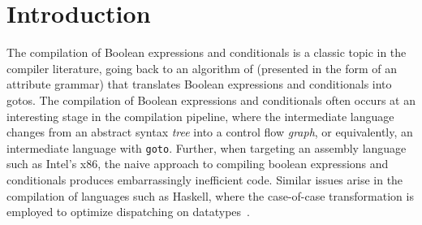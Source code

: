 \documentclass[sigplan,screen]{acmart}
\begin{document}



\maketitle

\section{Introduction}

The compilation of Boolean expressions and conditionals is a classic
topic in the compiler literature, going back to an algorithm of
\citet{Aho:1986qf} (presented in the form of an attribute grammar)
that translates Boolean expressions and conditionals into gotos. The
compilation of Boolean expressions and conditionals often occurs at an
interesting stage in the compilation pipeline, where the intermediate
language changes from an abstract syntax \emph{tree} into a control
flow \emph{graph}, or equivalently, an intermediate language with
\texttt{goto}. Further, when targeting an assembly language such as
Intel's x86, the naive approach to compiling boolean expressions and
conditionals produces embarrassingly inefficient code. Similar issues
arise in the compilation of languages such as Haskell, where the
case-of-case transformation is employed to optimize dispatching on
datatypes~\citep{PEYTONJONES19983}.
\end{document}
